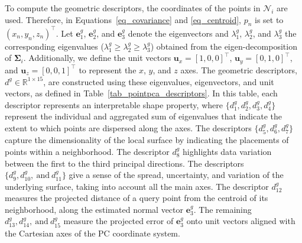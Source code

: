\documentclass[final,3p,times,twocolumn]{elsarticle}
\begin{document}
To compute the geometric descriptors, the coordinates of the points in $\mathcal{N}_i$ are used. Therefore, in Equations~\ref{eq_covariance} and \ref{eq_centroid}, $p_n$ is set to $(x_n, y_n, z_n)^\top$. Let $\textbf{e}_1^g$, $\textbf{e}_2^g$, and $\textbf{e}_3^g$ denote the eigenvectors and $\lambda_1^g$, 
$\lambda_2^g$, and $\lambda_3^g$ the corresponding eigenvalues ($\lambda_1^g \geq \lambda_2^g \geq \lambda_3^g$) obtained from the eigen-decomposition of $\mathbf{\Sigma}_i$. Additionally, we define the unit vectors $\mathbf{u}_x = [1, 0, 0]^\top$, $\mathbf{u}_y = [0, 1, 0]^\top$, and $\mathbf{u}_z = [0, 0, 1]^\top$ to represent the $x$, $y$, and $z$ axes. The geometric descriptors, $d^g \in \mathbb{R}^{1 \times 15}$, are constructed using these eigenvalues, eigenvectors, and unit vectors, as defined in Table~\ref{tab_pointpca_descriptors}. In this table, each descriptor represents an interpretable shape property, where $\{d_1^g, d_2^g, d_3^g, d_4^g \}$ represent the individual and aggregated sum of eigenvalues that indicate the extent to which points are dispersed along the axes. The descriptors $\{d_5^g, d_6^g, d_7^g \}$  capture the dimensionality of the local surface by indicating the placements of points within a neighborhood. The descriptor $d_8^g$ highlights data variation between the first to the third principal directions. The descriptors $\{d_9^g, d_{10}^g, ~\text{and}~ d_{11}^g \}$ give a sense of the spread, uncertainty, and variation of the underlying surface, taking into account all the main axes. The descriptor $d_{12}^g$ measures the projected distance of a query point from the centroid of its neighborhood, along the estimated normal vector $\mathbf{e}_3^g$. The remaining $d_{13}^g, d_{14}^g, ~\text{and}~ d_{15}^g$ measure the projected error of $\mathbf{e}_3^g$ onto unit vectors aligned with the Cartesian axes of the \gls{PC} coordinate system.
\end{document}
